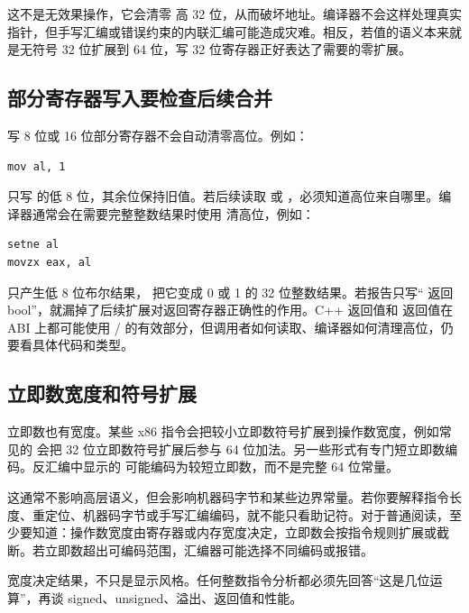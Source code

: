 这不是无效果操作，它会清零  高 32 位，从而破坏地址。编译器不会这样处理真实指针，但手写汇编或错误约束的内联汇编可能造成灾难。相反，若值的语义本来就是无符号 32 位扩展到 64 位，写 32 位寄存器正好表达了需要的零扩展。

\subsection{部分寄存器写入要检查后续合并}

写 8 位或 16 位部分寄存器不会自动清零高位。例如：

\begin{lstlisting}
mov al, 1
\end{lstlisting}

只写  的低 8 位，其余位保持旧值。若后续读取  或 ，必须知道高位来自哪里。编译器通常会在需要完整整数结果时使用  清高位，例如：

\begin{lstlisting}
setne al
movzx eax, al
\end{lstlisting}

 只产生低 8 位布尔结果， 把它变成 0 或 1 的 32 位整数结果。若报告只写“ 返回 bool”，就漏掉了后续扩展对返回寄存器正确性的作用。C++  返回值和  返回值在 ABI 上都可能使用 / 的有效部分，但调用者如何读取、编译器如何清理高位，仍要看具体代码和类型。

\subsection{立即数宽度和符号扩展}

立即数也有宽度。某些 x86 指令会把较小立即数符号扩展到操作数宽度，例如常见的  会把 32 位立即数符号扩展后参与 64 位加法。另一些形式有专门短立即数编码。反汇编中显示的  可能编码为较短立即数，而不是完整 64 位常量。

这通常不影响高层语义，但会影响机器码字节和某些边界常量。若你要解释指令长度、重定位、机器码字节或手写汇编编码，就不能只看助记符。对于普通阅读，至少要知道：操作数宽度由寄存器或内存宽度决定，立即数会按指令规则扩展或截断。若立即数超出可编码范围，汇编器可能选择不同编码或报错。

\begin{keyidea}
宽度决定结果，不只是显示风格。任何整数指令分析都必须先回答“这是几位运算”，再谈 signed、unsigned、溢出、返回值和性能。
\end{keyidea}

